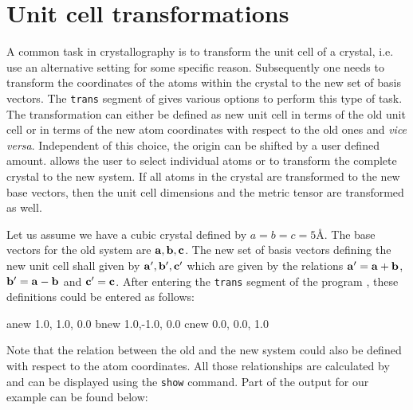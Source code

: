 
\section{Unit cell transformations \label{cryst-trans}}

A common task in crystallography is to transform the unit cell of a
crystal, i.e.  use an alternative setting for some specific reason.
Subsequently one needs to transform the coordinates of the atoms
within the crystal to the new set of basis vectors.  The {\tt trans}
segment of \Discus gives various options to perform this type
of task.  The transformation can either be defined as new unit cell
in terms of the old unit cell or in terms of the new atom
coordinates with respect to the old ones and {\it vice versa}.
Independent of this choice, the origin can be shifted by a user
defined amount.  \Discus allows the user to select individual
atoms or to transform the complete crystal to the new system. If all
atoms in the crystal are transformed to the new base vectors, then
the unit cell dimensions and the metric tensor are transformed as
well. \par

Let us assume we have a cubic crystal defined by $a = b = c = 5$\AA.
The base vectors for the old system are ${\bf a},{\bf b}, {\bf c}$.
The new set of basis vectors defining the new unit cell shall given
by ${\bf a}',{\bf b}',{\bf c}'$ which are given by the relations
${\bf a}' = {\bf a}+{\bf b}$, ${\bf b}' = {\bf a}-{\bf b}$ and ${\bf
c}'={\bf c}$.  After entering the {\tt trans} segment of the program
\Discus, these definitions could be entered as follows:
%
\begin{MacVerbatim}
     anew 1.0, 1.0, 0.0
     bnew 1.0,-1.0, 0.0
     cnew 0.0, 0.0, 1.0
\end{MacVerbatim}
%
Note that the relation between the old and the new system could also
be defined with respect to the atom coordinates.  All those
relationships are calculated by \Discus and can be displayed
using the {\tt show} command. Part of the output for our example can
be found below:
%

